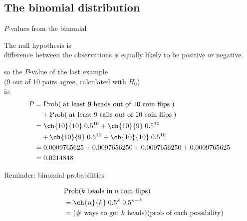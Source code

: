 \subsection{The binomial distribution}

\begin{frame}{$P$-values from the binomial}

  The null hypothesis is \\
  \hspace{2em}  difference between the observations is equally likely to be positive or negative.

    \vspace{2em}

    so the $P$-value of the last example \\
    (9 out of 10 pairs agree, calculated with $H_0$) \\
    is:
    \begin{align*} 
      P &= \mbox{Prob}( \; \text{at least 9 heads out of 10 coin flips}\; ) \\
       &\quad + \mbox{Prob}( \; \text{at least 9 tails out of 10 coin flips}\; ) \\
       &= \ch{10}{10} \; 0.5^{10} + \ch{10}{9} \; 0.5^{10} \\
       &\quad + \ch{10}{9} \; 0.5^{10} + \ch{10}{10}\;  0.5^{10} \\
       &= 0.0009765625 + 0.0097656250 + 0.0097656250 + 0.0009765625 \\
       &= 0.0214848
     \end{align*}

\end{frame}

\begin{frame}{Reminder: binomial probabilities}

  \begin{align*}
    &\mbox{Prob}( k \; \text{heads in} \; n \; \text{coin flips} ) \\
    \qquad \qquad &= \ch{n}{k} \; 0.5^k \; 0.5^{n-k} \\
    \qquad \qquad &= \text{(\# ways to get $k$ heads)} \text{(prob of each possibility)}
  \end{align*}

    \vspace{2em}



\end{frame}

